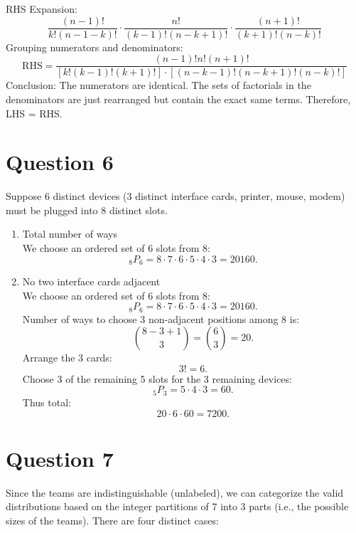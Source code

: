 \documentclass[twoside]{article}
\begin{document}
RHS Expansion: \[\frac{(n-1)!}{k!(n-1-k)!} \cdot \frac{n!}{(k-1)!(n-k+1)!} \cdot \frac{(n+1)!}{(k+1)!(n-k)!}\]
Grouping numerators and denominators: \[ \text{RHS} = \frac{(n-1)! n! (n+1)!}{ [k! (k-1)! (k+1)!] \cdot [(n-k-1)! (n-k+1)! (n-k)!] }\]
Conclusion:
The numerators are identical. The sets of factorials in the denominators are just rearranged but contain the exact same terms. Therefore, LHS = RHS.

\section*{Question 6}
Suppose 6 distinct devices (3 distinct interface cards, printer, mouse, modem) must be plugged into 8 distinct slots.
\begin{enumerate}
    \item[(a)] Total number of ways \\
               We choose an ordered set of 6 slots from 8:\[ {}_{8}P_{6} = 8\cdot7\cdot6\cdot5\cdot4\cdot3 = 20160. \]
    \item[(b)] No two interface cards adjacent \\
               We choose an ordered set of 6 slots from 8:\[ {}_{8}P_{6} = 8\cdot7\cdot6\cdot5\cdot4\cdot3 = 20160. \]
               Number of ways to choose 3 non-adjacent positions among 8 is: \[ \binom{8-3+1}{3} = \binom{6}{3} = 20. \]
               Arrange the 3 cards: \[3! = 6. \]
               Choose 3 of the remaining 5 slots for the 3 remaining devices: \[ {}_{5}P_{3} = 5\cdot4\cdot3 = 60. \]
               Thus total: \[ 20 \cdot 6 \cdot 60 = 7200. \]
\end{enumerate}

\section*{Question 7}
Since the teams are indistinguishable (unlabeled), we can categorize the valid distributions based on the integer partitions of 7 into 3 parts (i.e., the possible sizes of the teams). There are four distinct cases:
\end{document}
